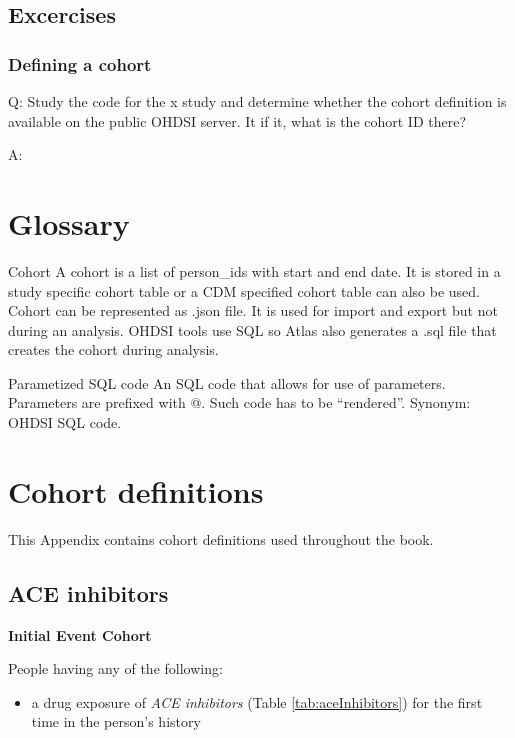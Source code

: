 \documentclass[11pt]{book}
\providecommand{\tightlist}{%
  \setlength{\itemsep}{0pt}\setlength{\parskip}{0pt}}
\begin{document}
\section{Excercises}\label{excercises-2}

\subsection{Defining a cohort}\label{defining-a-cohort}

Q: Study the code for the x study and determine whether the cohort
definition is available on the public OHDSI server. It if it, what is
the cohort ID there?

A:

\appendix


\chapter{Glossary}\label{Glossary}

Cohort A cohort is a list of person\_ids with start and end date. It is
stored in a study specific cohort table or a CDM specified cohort table
can also be used. Cohort can be represented as .json file. It is used
for import and export but not during an analysis. OHDSI tools use SQL so
Atlas also generates a .sql file that creates the cohort during
analysis.

Parametized SQL code An SQL code that allows for use of parameters.
Parameters are prefixed with @. Such code has to be ``rendered''.
Synonym: OHDSI SQL code.

\chapter{Cohort definitions}\label{CohortDefinitions}

This Appendix contains cohort definitions used throughout the book.

\section{ACE inhibitors}\label{AceInhibitors}

\textbf{Initial Event Cohort}

People having any of the following:

\begin{itemize}
\tightlist
\item
  a drug exposure of \emph{ACE inhibitors} (Table
  \ref{tab:aceInhibitors}) for the first time in the person's history
\end{itemize}
\end{document}
